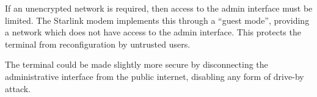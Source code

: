 If an unencrypted network is required, then access to the admin interface must be limited.
The Starlink modem implements this through a ``guest mode'', providing a network which does not have access to the admin interface.
This protects the terminal from reconfiguration by untrusted users.

The terminal could be made slightly more secure by disconnecting the administrative interface from the public internet, disabling any form of drive-by attack.

\begin{comment}
  Edd's notes:

Related work:

Zoom exploit, hitting services running on the local network

https://developer.mozilla.org/en-US/docs/Web/Security/Same-origin_policy
"Cross-origin writes are typically allowed"

https://bugzilla.mozilla.org/show_bug.cgi?id=629094
https://www.grepular.com/Abusing_HTTP_Status_Codes_to_Expose_Private_Information
HTTP status code abuse to extract information cross-origin

https://bugzilla.mozilla.org/show_bug.cgi?id=354493
Zoom videoconferencing problem

https://bugzilla.mozilla.org/show_bug.cgi?id=371598
Drive-by pharming through browsers


Security constraints:

Defeating drive-by javascript:
unencrypted passwords prevents silent drive-by javascript, potentially
websites can still brute force or phish the password from you
some sort of CSRF token from http://my.starlink.com?

Defeating spoofing http://my.starlink.com:
Vulnerable: because it's using plaintext http
Reason: you can't make a request to an insecure origin from a secure origin (need citation)
use https
passwords prevent silently changing the dish

Attackers on local network:

HSTS could be used with TLS to secure this
CSRF tokens

%


\end{comment}
